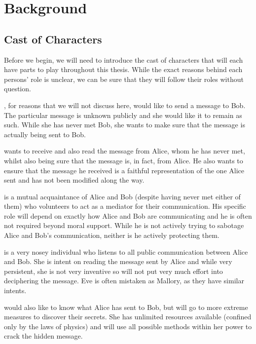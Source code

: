 %
%
\graphicspath{{./chapters/chapter02/fig02/}}

\let\textcircled=\pgftextcircled
\chapter{Background}
\label{chap:background}

\section{Cast of Characters}

Before we begin, we will need to introduce the cast of characters that will each have parts to play throughout this thesis. While the exact reasons behind each persons' role is unclear, we can be sure that they will follow their roles without question. 

, for reasons that we will not discuss here, would like to send a message to Bob. The particular message is unknown publicly and she would like it to remain as such. While she has never met Bob, she wants to make sure that the message is actually being sent to Bob.

 wants to receive and also read the message from Alice, whom he has never met, whilst also being sure that the message is, in fact, from Alice. He also wants to ensure that the message he received is a faithful representation of the one Alice sent and has not been modified along the way.

 is a mutual acquaintance of Alice and Bob (despite having never met either of them) who volunteers to act as a mediator for their communication. His specific role will depend on exactly how Alice and Bob are communicating and he is often not required beyond moral support. While he is not actively trying to sabotage Alice and Bob's communication, neither is he actively protecting them.

 is a very nosey individual who listens to all public communication between Alice and Bob. She is intent on reading the message sent by Alice and while very persistent, she is not very inventive so will not put very much effort into deciphering the message. Eve is often mistaken as Mallory, as they have similar intents.

 would also like to know what Alice has sent to Bob, but will go to more extreme measures to discover their secrets. She has unlimited resources available (confined only by the laws of physics) and will use all possible methods within her power to crack the hidden message. 

